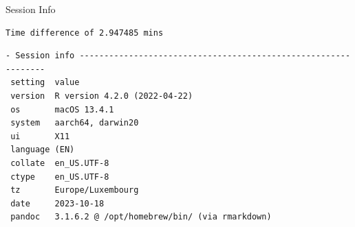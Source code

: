 \documentclass[
  ignorenonframetext,
  aspectratio=169,
]{beamer}
\begin{document}
\begin{frame}[fragile]{Session Info}
\protect\hypertarget{session-info}{}
\linespread{0.5}

\begin{verbatim}
Time difference of 2.947485 mins
\end{verbatim}

\linespread{2}

\linespread{0.5}

\begin{verbatim}
- Session info ---------------------------------------------------------------
 setting  value
 version  R version 4.2.0 (2022-04-22)
 os       macOS 13.4.1
 system   aarch64, darwin20
 ui       X11
 language (EN)
 collate  en_US.UTF-8
 ctype    en_US.UTF-8
 tz       Europe/Luxembourg
 date     2023-10-18
 pandoc   3.1.6.2 @ /opt/homebrew/bin/ (via rmarkdown)


\end{verbatim}
\end{frame}
\end{document}
